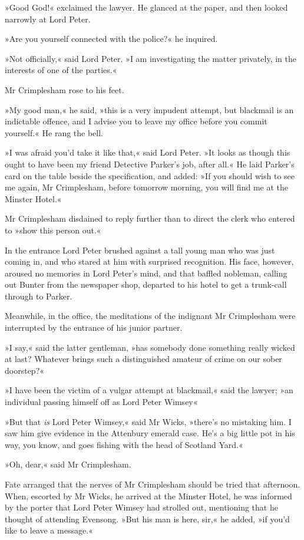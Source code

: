 »Good God!« exclaimed the lawyer. He glanced at the paper, and then looked narrowly at Lord Peter.

»Are you yourself connected with the police?« he inquired.

»Not officially,« said Lord Peter. »I am investigating the matter privately, in the interests of one of the parties.«

Mr Crimplesham rose to his feet.

»My good man,« he said, »this is a very impudent attempt, but blackmail is an indictable offence, and I advise you to leave my office before you commit yourself.« He rang the bell.

»I was afraid you'd take it like that,« said Lord Peter. »It looks as though this ought to have been my friend Detective Parker's job, after all.« He laid Parker's card on the table beside the specification, and added: »If you should wish to see me again, Mr Crimplesham, before tomorrow morning, you will find me at the Minster Hotel.«

Mr Crimplesham disdained to reply further than to direct the clerk who entered to »show this person out.«

In the entrance Lord Peter brushed against a tall young man who was just coming in, and who stared at him with surprised recognition. His face, however, aroused no memories in Lord Peter's mind, and that baffled nobleman, calling out Bunter from the newspaper shop, departed to his hotel to get a trunk-call through to Parker.

Meanwhile, in the office, the meditations of the indignant Mr Crimplesham were interrupted by the entrance of his junior partner.

»I say,« said the latter gentleman, »has somebody done something really wicked at last? Whatever brings such a distinguished amateur of crime on our sober doorstep?«

»I have been the victim of a vulgar attempt at blackmail,« said the lawyer; »an individual passing himself off as Lord Peter Wimsey\longdash«

»But that \textit{is} Lord Peter Wimsey,« said Mr Wicks, »there's no mistaking him. I saw him give evidence in the Attenbury emerald case. He's a big little pot in his way, you know, and goes fishing with the head of Scotland Yard.«

»Oh, dear,« said Mr Crimplesham.

Fate arranged that the nerves of Mr Crimplesham should be tried that afternoon. When, escorted by Mr Wicks, he arrived at the Minster Hotel, he was informed by the porter that Lord Peter Wimsey had strolled out, mentioning that he thought of attending Evensong. »But his man is here, sir,« he added, »if you'd like to leave a message.«

